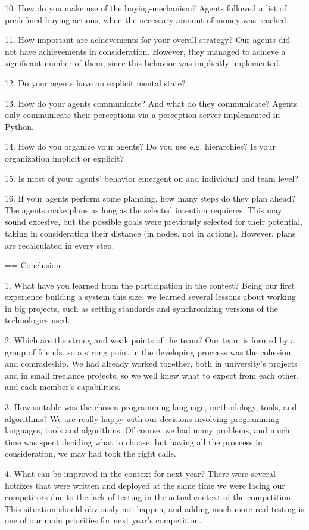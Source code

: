 10. How do you make use of the buying-mechanism?  Agents followed a list of
predefined buying actions, when the necessary amount of money was reached.

11. How important are achievements for your overall strategy?  Our agents did
not have achievements in consideration. However, they managed to achieve a
significant number of them, since this behavior was implicitly implemented.


12. Do your agents have an explicit mental state?

13. How do your agents communicate? And what do they communicate?  Agents only
communicate their perceptions via a perception server implemented in Python.

14. How do you organize your agents? Do you use e.g. hierarchies? Is your
organization implicit or explicit?

15. Is most of your agents’ behavior emergent on and individual and team
level?

16. If your agents perform some planning, how many steps do they plan ahead?
The agents make plans as long as the selected intention requieres. This may
sound excesive, but the possible goals were previously selected for their
potential, taking in consideration their distance (in nodes, not in actions).
However, plans are recalculated in every step.

== Conclusion

1. What have you learned from the participation in the contest?
    Being our first experience building a system this size, we learned several lessons about working in big projects, such as setting standards and synchronizing versions of the technologies used.


2. Which are the strong and weak points of the team?
    Our team is formed by a group of friends, so a strong point in the
    developing proccess was the cohesion and comradeship. We had
    already worked together, both in university's projects and in
    small freelance projects, so we well knew what to expect from each other,
    and each member's capabilities.

  
3. How suitable was the chosen programming language, methodology, tools, and
algorithms?
    We are really happy with our decisions involving programming languages,
    tools and algorithms. Of course, we had many problems, and much time was
    spent deciding what to choose, but having all the proccess in
    consideration, we may had took the right calls.

4. What can be improved in the context for next year?
    There were several hotfixes that were written and deployed at the same time we were facing our competitors due to the lack of testing in the actual context of the competition. This situation should obviously not happen, and adding much more real testing is one of our main priorities for next year's competition.


